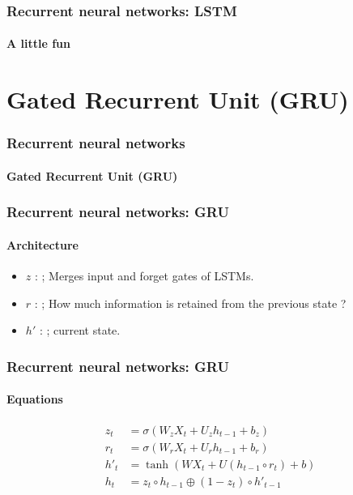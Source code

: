 \documentclass[xcolor=table]{beamer}
\begin{document}
\begin{frame}
	\frametitle{Recurrent neural networks: LSTM}
	\framesubtitle{A little fun}

\begin{center}
\end{center}

\end{frame}

\section{Gated Recurrent Unit (GRU)}

\begin{frame}
	\frametitle{Recurrent neural networks}
	\framesubtitle{Gated Recurrent Unit (GRU)}
	
\end{frame}

\begin{frame}
	\frametitle{Recurrent neural networks: GRU}
	\framesubtitle{Architecture}
	
	\begin{minipage}{0.50\textwidth} 
		\begin{itemize}
			\item $z$ :  ; 
			Merges input and forget gates of LSTMs.
			\item $r$ :  ; 
			How much information is retained from the previous state ?
			\item $h'$ :  ;
			current state.
		\end{itemize}
	\end{minipage}
	\begin{minipage}{0.49\textwidth}
	\end{minipage}
	

\end{frame}

\begin{frame}
	\frametitle{Recurrent neural networks: GRU}
	\framesubtitle{Equations}
	
	\begin{align*}
	z_t &= \sigma(W_z X_t + U_z h_{t-1} + b_z) \\
	r_t &= \sigma(W_r X_t + U_r h_{t-1} + b_r) \\
	h'_t &= \tanh(W X_t + U (h_{t-1} \circ r_t) + b) \\
	h_t &= z_t \circ h_{t-1} \oplus (1-z_t) \circ h'_{t-1}
	\end{align*}
	
\end{frame}
\end{document}
